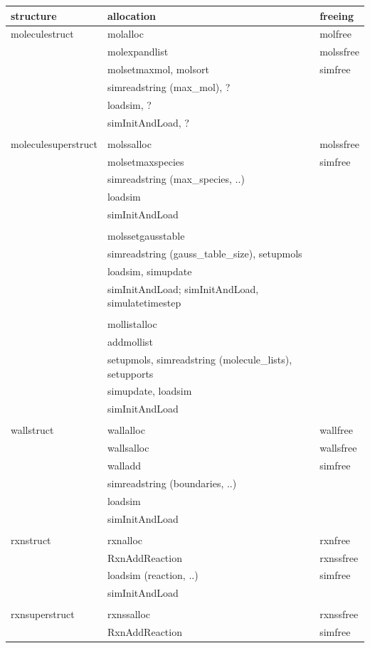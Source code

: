 \documentclass {scrbook}
\begin{document}
\begin{ttfamily}
\begin{longtable}[c]{lll}
structure&allocation&freeing\\
\hline
moleculestruct&molalloc&molfree\\
&molexpandlist&molssfree\\
&molsetmaxmol, molsort&simfree\\
&simreadstring (max\_mol), ?\\
&loadsim, ?\\
&simInitAndLoad, ?\\
\\
moleculesuperstruct&molssalloc&molssfree\\
&molsetmaxspecies&simfree\\
&simreadstring (max\_species, ..)\\
&loadsim\\
&simInitAndLoad\\
\\
&molssetgausstable\\
&simreadstring (gauss\_table\_size), setupmols\\
&loadsim, simupdate\\
&simInitAndLoad; simInitAndLoad, simulatetimestep\\
\\
&mollistalloc\\
&addmollist\\
&setupmols, simreadstring (molecule\_lists), setupports\\
&simupdate, loadsim\\
&simInitAndLoad\\
\\
wallstruct&wallalloc&wallfree\\
&wallsalloc&wallsfree\\
&walladd&simfree\\
&simreadstring (boundaries, ..)\\
&loadsim\\
&simInitAndLoad\\
\\
rxnstruct&rxnalloc&rxnfree\\
&RxnAddReaction&rxnssfree\\
&loadsim (reaction, ..)&simfree\\
&simInitAndLoad\\
\\
rxnsuperstruct&rxnssalloc&rxnssfree\\
&RxnAddReaction&simfree\\

\end{longtable}
\end{ttfamily}
\end{document}
